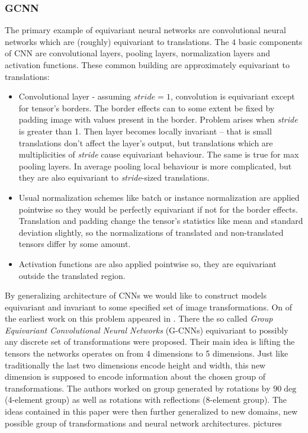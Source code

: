     \subsubsection{GCNN}
    The primary example of equivariant neural networks are convolutional neural
    networks which are (roughly) equivariant to translations. The $4$ basic
    components of CNN are convolutional layers, pooling layers, normalization
    layers and activation functions.  These common building are approximately
    equivariant to translations:
    \begin{itemize}
        \item Convolutional layer - assuming $\textit{stride}=1$, convolution is
            equivariant except for tensor's borders. The border effects can to
            some extent be fixed by padding image with values present in the
            border.  Problem arises when \textit{stride} is greater than 1. Then
            layer becomes locally invariant -- that is small translations don't
            affect the layer's output, but translations which are multiplicities
            of \textit{stride} cause equivariant behaviour. The same is true for
            max pooling layers. In average pooling local behaviour is more
            complicated, but they are also equivariant to \textit{stride}-sized
            translations.
            \item Usual normalization schemes like batch or instance
                normalization are applied pointwise so they would be perfectly
                equivariant if not for the border effects.  Translation and
                padding change the tensor's statistics like mean and standard
                deviation slightly, so the normalizations of translated and
                non-translated tensors differ by some amount.
            \item Activation functions are also applied pointwise so, they are
                equivariant outside the translated region.
    \end{itemize}
    By generalizing architecture of CNNs we would like to construct models
    equivariant and invariant to some specified set of image transformations.
    On of the earliest work on this problem appeared in \cite{cohen2016}. There
    the so called \textit{Group Equivariant Convolutional Neural Networks}
    (G-CNNs) equivariant to possibly any discrete set of transformations were
    proposed. Their main idea is lifting the tensors the networks operates on
    from 4 dimensions to 5 dimensions. Just like traditionally the last two
    dimensions encode height and width, this new dimension is supposed to
    encode information about the chosen group of transformations. The authors
    worked on group generated by rotations by $90\deg$ (4-element group) as well as rotations
    with reflections (8-element group).
    The ideas contained in this paper were then further generalized to new
    domains, new possible group of transformations and neural network
    architectures. %
    pictures


